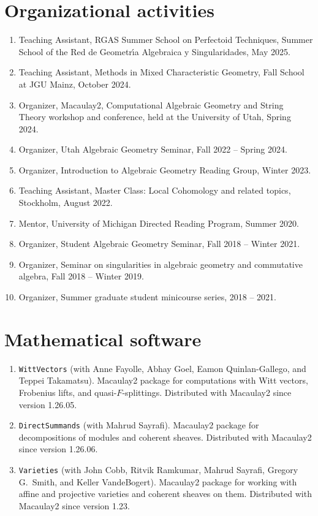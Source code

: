 \documentclass{res}
\begin{document}
\begin{resume}
\section{Organizational activities}
\begin{enumerate}
\item Teaching Assistant, RGAS Summer School on Perfectoid Techniques, Summer School of the Red de Geometr\'{\i}a Algebraica y Singularidades, May 2025.
\item Teaching Assistant, Methods in Mixed Characteristic Geometry, Fall School at JGU Mainz, October 2024.
\item Organizer, Macaulay2, Computational Algebraic Geometry and String Theory workshop and conference, held at the University of Utah, Spring 2024.
\item Organizer, Utah Algebraic Geometry Seminar, Fall 2022 -- Spring 2024.
\item Organizer, Introduction to Algebraic Geometry Reading Group, Winter 2023.
\item Teaching Assistant, Master Class: Local Cohomology and related topics, Stockholm, August 2022.
\item Mentor, University of Michigan Directed Reading Program, Summer 2020.
\item Organizer, Student Algebraic Geometry Seminar, Fall 2018 -- Winter 2021.
\item Organizer, Seminar on singularities in algebraic geometry and commutative algebra, Fall 2018 -- Winter 2019.
\item Organizer, Summer graduate student minicourse series, 2018 -- 2021.
\end{enumerate}

 
\section{Mathematical software} 

\begin{enumerate}
\item \texttt{WittVectors} (with Anne Fayolle, Abhay Goel, Eamon Quinlan-Gallego, and Teppei Takamatsu). Macaulay2 package for computations with Witt vectors, Frobenius lifts, and quasi-$F$-splittings. Distributed with Macaulay2 since version 1.26.05.
\item \texttt{DirectSummands} (with Mahrud Sayrafi). Macaulay2 package for decompositions of modules and coherent sheaves. Distributed with Macaulay2 since version 1.26.06.
\item \texttt{Varieties} (with John Cobb, Ritvik Ramkumar, Mahrud Sayrafi, Gregory G.~Smith, and Keller VandeBogert). Macaulay2 package for working with affine and projective varieties and coherent sheaves on them. Distributed with Macaulay2 since version 1.23.
\end{enumerate}


\end{resume}
\end{document}
